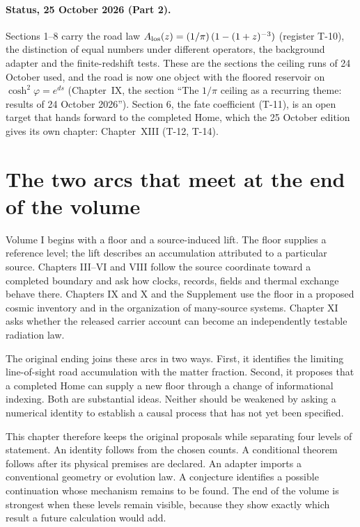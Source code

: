 

\paragraph*{Status, 25 October 2026 (Part 2).} Sections 1--8 carry the road law $A_{\rm los}(z)=(1/\pi)\,(1-(1+z)^{-3})$ (register T-10), the distinction of equal numbers under different operators, the background adapter and the finite-redshift tests. These are the sections the ceiling runs of 24 October used, and the road is now one object with the floored reservoir on $\cosh^2\varphi=e^{ds}$ (Chapter~IX, the section ``The $1/\pi$ ceiling as a recurring theme: results of 24 October 2026''). Section 6, the fate coefficient (T-11), is an open target that hands forward to the completed Home, which the 25 October edition gives its own chapter: Chapter~XIII (T-12, T-14).


\section{The two arcs that meet at the end of the volume}
Volume I begins with a floor and a source-induced lift. The floor supplies a reference level; the lift describes an accumulation attributed to a particular source. Chapters III--VI and VIII follow the source coordinate toward a completed boundary and ask how clocks, records, fields and thermal exchange behave there. Chapters IX and X and the Supplement use the floor in a proposed cosmic inventory and in the organization of many-source systems. Chapter XI asks whether the released carrier account can become an independently testable radiation law.

The original ending joins these arcs in two ways. First, it identifies the limiting line-of-sight road accumulation with the matter fraction. Second, it proposes that a completed Home can supply a new floor through a change of informational indexing. Both are substantial ideas. Neither should be weakened by asking a numerical identity to establish a causal process that has not yet been specified.

This chapter therefore keeps the original proposals while separating four levels of statement. An identity follows from the chosen counts. A conditional theorem follows after its physical premises are declared. An adapter imports a conventional geometry or evolution law. A conjecture identifies a possible continuation whose mechanism remains to be found. The end of the volume is strongest when these levels remain visible, because they show exactly which result a future calculation would add.

